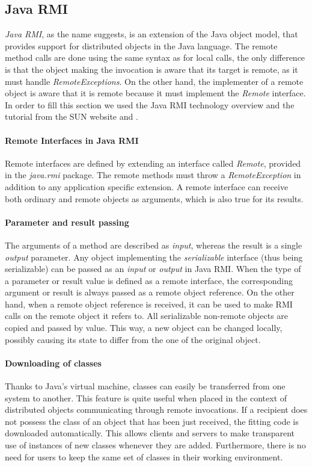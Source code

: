 
\subsection{Java RMI} 
\label{JavaRMI}   
\textit{Java RMI}, as the name suggests, is an extension of the Java object model, that provides support for distributed objects in the Java language. The remote method calls are done using the same syntax as for local calls, the only difference is that the object making the invocation is aware that its target is remote, as it must handle \textit{RemoteExceptions}. On the other hand, the implementer of a remote object is aware that it is remote because it must implement the \textit{Remote} interface. In order to fill this section we used the Java RMI technology overview \cite{RMI-sun} and the tutorial from the SUN website \cite{RMI-client-sun} and \cite{RMI-overview-sun}.

\paragraph{Remote Interfaces in Java RMI}
Remote interfaces are defined by extending an interface called \textit{Remote}, provided in the \textit{java.rmi} package. The remote methods must throw a \textit{RemoteException} in addition to any application specific extension. A remote interface can receive both ordinary and remote objects as arguments, which is also true for its results.

\paragraph{Parameter and result passing}
The arguments of a method are described as \textit{input}, whereas the result is a single \textit{output} parameter. Any object implementing the \textit{serializable} interface (thus being serializable) can be passed as an \textit{input} or \textit{output} in Java RMI.
When the type of a parameter or result value is defined as a remote interface, the corresponding argument or result is always passed as a remote object reference. On the other hand, when a remote object reference is received, it can be used to make RMI calls on the remote object it refers to.
All serializable non-remote objects are copied and passed by value. This way, a new object can be changed locally, possibly causing its state to differ from the one of the original object.

\paragraph{Downloading of classes}
Thanks to Java's virtual machine, classes can easily be transferred from one system to another. This feature is quite useful when placed in the context of distributed objects communicating through remote invocations. If a recipient does not possess the class of an object that has been just received, the fitting code is downloaded automatically. This allows clients and servers to make transparent use of instances of new classes whenever they are added. Furthermore, there is no need for users to keep the same set of classes in their working environment.

